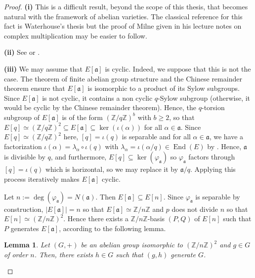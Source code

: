 \documentclass[a4paper,10pt,notitlepage]{report}
\theoremstyle{definition}
\theoremstyle{plain}
\newtheorem{Lemma}[Definition]{Lemma}
\theoremstyle{definition}
\newcommand{\Z}{\mathbb{Z}}
\renewcommand{\(}{\left(}
\renewcommand{\)}{\right)}
\newcommand{\mf}[1]{\mathfrak{#1}}
\DeclareMathOperator{\End}{End}
\begin{document}
\begin{proof}
\textbf{(i)} This is a difficult result, beyond the scope of this thesis, that becomes natural with the framework of abelian varieties. The classical reference for this fact is Waterhouse's thesis \cite[Proposition 3.12]{Waterhouse1969} but the proof of Milne given in his lecture notes on complex multiplication \cite[Proposition 7.28]{Milne_CM} may be easier to follow.

\textbf{(ii)} See \cite[Theorem 3.15]{Waterhouse1969} or \cite[Proposition 7.29]{Milne_CM}.

\textbf{(iii)} We may assume that $E[\mf{a}]$ is cyclic. Indeed, we suppose that this is not the case. The theorem of finite abelian group structure and the Chinese remainder theorem ensure that $E[\mf{a}]$ is isomorphic to a product of its Sylow subgroups. Since $E[\mf{a}]$ is not cyclic, it contains a non cyclic $q$-Sylow subgroup (otherwise, it would be cyclic by the Chinese remainder theorem). Hence, the $q$-torsion subgroup of $E[\mf{a}]$ is of the form $(\Z/q\Z)^b$ with $b\geq 2$, so that $E[q]\simeq(\Z/q\Z)^2\subseteq E[\mf{a}]\subseteq\ker(\iota(\alpha))$ for all $\alpha\in\mf{a}$. Since $E[q]\simeq(\Z/q\Z)^2$ here, $[q]=\iota(q)$ is separable and for all $\alpha\in\mf{a}$, we have a factorization $\iota(\alpha)=\lambda_\alpha\circ \iota(q)$ with $\lambda_\alpha=\iota(\alpha/q)\in\End(E)$ by \cite[Corollary III.4.11]{Silverman1}. Hence, $\mf{a}$ is divisible by $q$, and furthermore, $E[q]\subseteq \ker(\varphi_{\mf{a}})$ so $\varphi_{\mf{a}}$ factors through $[q]=\iota(q)$ which is horizontal, so we may replace it by $\mf{a}/q$. Applying this process iteratively makes $E[\mf{a}]$ cyclic. 

Let $n:=\deg(\varphi_{\mf{a}})=N(\mf{a})$. Then $E[\mf{a}]\subseteq E[n]$. Since $\varphi_{\mf{a}}$ is separable by construction, $|E[\mf{a}]|=n$ so that $E[\mf{a}]\simeq\Z/n\Z$ and $p$ does not divide $n$ so that $E[n]\simeq (\Z/n\Z)^2$.  Hence there exists a $\Z/n\Z$-basis $(P,Q)$ of $E[n]$ such that $P$ generates $E[\mf{a}]$, according to the following lemma.

\begin{Lemma}
Let $(G,+)$ be an abelian group isomorphic to $(\Z/n\Z)^2$ and $g\in G$ of order $n$. Then, there exists $h\in G$ such that $(g,h)$ generate $G$.
\end{Lemma}


\end{proof}
\end{document}
